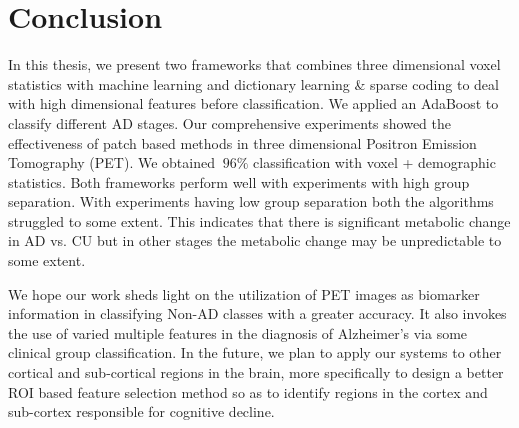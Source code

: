 \chapter{Conclusion}
In this thesis, we present two frameworks that combines three dimensional voxel statistics with machine learning and  dictionary learning \& sparse coding to deal with high dimensional features before classification. We applied an AdaBoost to classify different AD stages. Our comprehensive experiments showed the effectiveness of patch based methods in three dimensional Positron Emission Tomography (PET). We obtained $ ~96 \% $ classification with voxel + demographic statistics.
Both frameworks perform well with experiments with high group separation. With experiments having low group separation both the algorithms struggled to some extent. This indicates that there is significant metabolic change in AD vs. CU but in other stages the metabolic change may be unpredictable to some extent. 

We hope our work sheds light on the utilization of PET images as biomarker information in classifying Non-AD classes with a greater accuracy. It also invokes the use of varied multiple features in the diagnosis of Alzheimer's via some clinical group classification. In the future, we plan to apply our systems to other cortical and sub-cortical regions in the brain, more specifically to design a better ROI based feature selection method so as to identify regions in the cortex and sub-cortex responsible for cognitive decline.